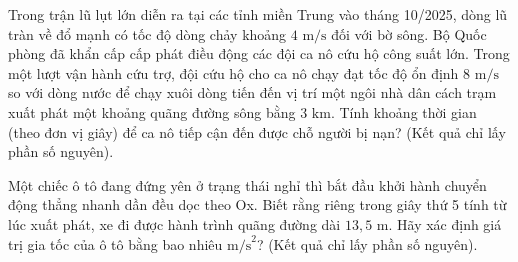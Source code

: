 \begin{ex}%
	Trong trận lũ lụt lớn diễn ra tại các tỉnh miền Trung vào tháng 10/2025, dòng lũ tràn về đổ mạnh có tốc độ dòng chảy khoảng $4\text{ m/s}$ đối với bờ sông. Bộ Quốc phòng đã khẩn cấp cấp phát điều động các đội ca nô cứu hộ công suất lớn. Trong một lượt vận hành cứu trợ, đội cứu hộ cho ca nô chạy đạt tốc độ ổn định $8\text{ m/s}$ so với dòng nước để chạy xuôi dòng tiến đến vị trí một ngôi nhà dân cách trạm xuất phát một khoảng quãng đường sông bằng $3\text{ km}$. Tính khoảng thời gian (theo đơn vị giây) để ca nô tiếp cận đến được chỗ người bị nạn? (Kết quả chỉ lấy phần số nguyên).
\end{ex}

\begin{ex}%
	Một chiếc ô tô đang đứng yên ở trạng thái nghỉ thì bắt đầu khởi hành chuyển động thẳng nhanh dần đều dọc theo Ox. Biết rằng riêng trong giây thứ 5 tính từ lúc xuất phát, xe đi được hành trình quãng đường dài $13,5\text{ m}$. Hãy xác định giá trị gia tốc của ô tô bằng bao nhiêu $\text{m/s}^2$? (Kết quả chỉ lấy phần số nguyên).
\end{ex}

